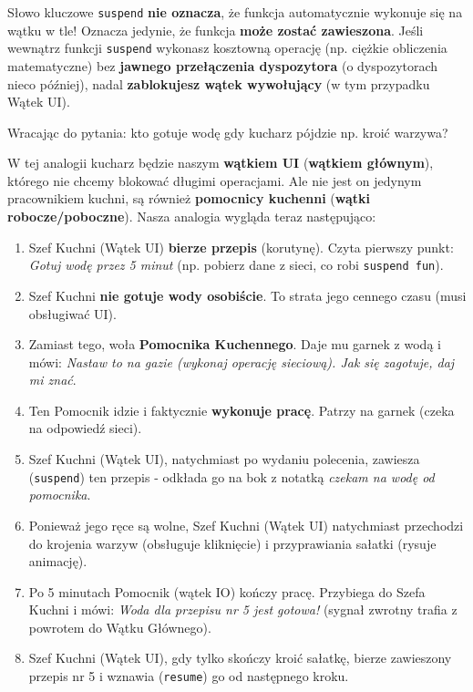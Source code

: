 Słowo kluczowe \texttt{suspend} \textbf{nie oznacza}, że funkcja automatycznie wykonuje się na wątku w tle! Oznacza jedynie, że funkcja \textbf{może zostać zawieszona}. Jeśli wewnątrz funkcji \texttt{suspend} wykonasz kosztowną operację (np. ciężkie obliczenia matematyczne) bez \textbf{jawnego przełączenia dyspozytora} (o dyspozytorach nieco później), nadal \textbf{zablokujesz wątek wywołujący} (w tym przypadku Wątek UI).

Wracając do pytania: kto gotuje wodę gdy kucharz pójdzie np. kroić warzywa?

W tej analogii kucharz będzie naszym \textbf{wątkiem UI} (\textbf{wątkiem głównym}), którego nie chcemy blokować długimi operacjami. Ale nie jest on jedynym pracownikiem kuchni, są również \textbf{pomocnicy kuchenni} (\textbf{wątki robocze/poboczne}). Nasza analogia wygląda teraz następująco:

\begin{enumerate}
\item Szef Kuchni (Wątek UI) \textbf{bierze przepis} (korutynę). Czyta pierwszy punkt: \textit{Gotuj wodę przez 5 minut} (np. pobierz dane z sieci, co robi \texttt{suspend fun}).
\item Szef Kuchni \textbf{nie gotuje wody osobiście}. To strata jego cennego czasu (musi obsługiwać UI).
\item Zamiast tego, woła \textbf{Pomocnika Kuchennego}. Daje mu garnek z wodą i mówi: \textit{Nastaw to na gazie (wykonaj operację sieciową). Jak się zagotuje, daj mi znać}.
\item Ten Pomocnik idzie i faktycznie \textbf{wykonuje pracę}. Patrzy na garnek (czeka na odpowiedź sieci).
\item Szef Kuchni (Wątek UI), natychmiast po wydaniu polecenia, zawiesza (\texttt{suspend}) ten przepis - odkłada go na bok z notatką \textit{czekam na wodę od pomocnika}.
\item Ponieważ jego ręce są wolne, Szef Kuchni (Wątek UI) natychmiast przechodzi do krojenia warzyw (obsługuje kliknięcie) i przyprawiania sałatki (rysuje animację).
\item Po 5 minutach Pomocnik (wątek IO) kończy pracę. Przybiega do Szefa Kuchni i mówi: \textit{Woda dla przepisu nr 5 jest gotowa!} (sygnał zwrotny trafia z powrotem do Wątku Głównego).
\item Szef Kuchni (Wątek UI), gdy tylko skończy kroić sałatkę, bierze zawieszony przepis nr 5 i wznawia (\texttt{resume}) go od następnego kroku.
\end{enumerate}

